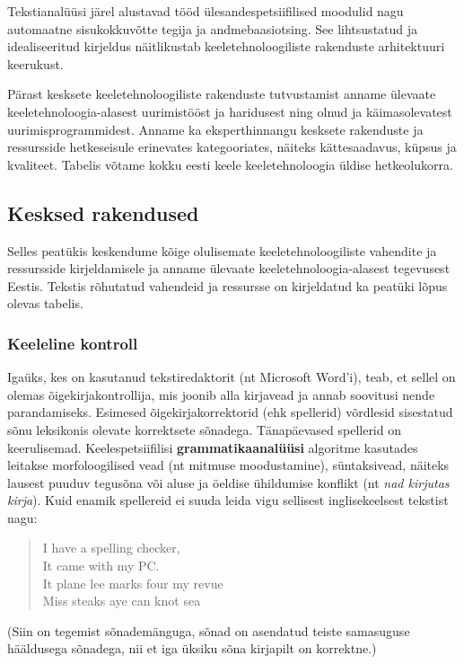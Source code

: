 \documentclass[]{../metanetpaper}
\begin{document}
\begin{multicols}{2}
Tekstianalüüsi järel alustavad tööd ülesandespetsiifilised moodulid nagu automaatne sisukokkuvõtte tegija ja andmebaasiotsing. 
See lihtsustatud ja idealiseeritud kirjeldus näitlikustab keeletehnoloogiliste rakenduste arhitektuuri keerukust. 

Pärast kesksete keeletehnoloogiliste rakenduste tutvustamist anname ülevaate keeletehnoloogia-alasest uurimistööst ja haridusest ning olnud ja käimasolevatest uurimisprogrammidest. 
Anname ka eksperthinnangu kesksete rakenduste ja ressursside hetkeseisule erinevates kategooriates, näiteks kättesaadavus, küpsus ja kvaliteet. 
Tabelis võtame kokku eesti keele keeletehnoloogia üldise hetkeolukorra. 

\subsection{Kesksed rakendused} 

Selles peatükis keskendume kõige olulisemate keeletehnoloogiliste vahendite ja ressursside kirjeldamisele ja anname ülevaate keeletehnoloogia-alasest tegevusest Eestis. 
Tekstis rõhutatud vahendeid ja ressursse on kirjeldatud ka peatüki lõpus olevas tabelis.

\subsubsection{Keeleline kontroll}

Igaüks, kes on kasutanud tekstiredaktorit (nt Microsoft Word’i), teab, et sellel on olemas õigekirjakontrollija, mis joonib alla kirjavead ja annab soovitusi nende parandamiseks. 
Esimesed õigekirjakorrektorid (ehk spellerid) võrdlesid sisestatud sõnu leksikonis olevate korrektsete sõnadega. 
Tänapäevased spellerid on keerulisemad. 
Keelespetsiifilisi \textbf{grammatikaanalüüsi} algoritme kasutades leitakse morfoloogilised vead (nt mitmuse moodustamine), süntaksivead, näiteks lausest puuduv tegusõna või aluse ja öeldise ühildumise konflikt (nt \textit{nad kirjutas kirja}). 
Kuid enamik spellereid ei suuda leida vigu sellisest inglisekeelsest tekstist \cite{zar1} nagu: 
\begin{quote}
      I have a spelling checker,\\
      It came with my PC.\\
      It plane lee marks four my revue\\
      Miss steaks aye can knot sea 
\end{quote}

(Siin on tegemist sõnademänguga, sõnad on asendatud teiste samasuguse hääldusega sõnadega, nii et iga üksiku sõna kirjapilt on korrektne.)


\end{multicols}
\end{document}
